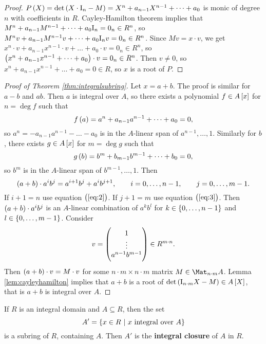 \begin{proof}
$ P\br{X} = \det \br{X \cdot \I_n - M} = X^n + a_{n - 1}X^{n - 1} + \dots + a_0 $ is monic of degree $ n $ with coefficients in $ R $. Cayley-Hamilton theorem implies that $ M^n + a_{n - 1}M^{n - 1} + \dots + a_0\mathrm{I}_n = 0_n \in R^n $, so $ M^nv + a_{n - 1}M^{n - 1}v + \dots + a_0\mathrm{I}_nv = 0_n \in R^n $. Since $ Mv = x \cdot v $, we get $ x^n \cdot v + a_{n - 1}x^{n - 1} \cdot v + \dots + a_0 \cdot v = 0_n \in R^n $, so $ \br{x^n + a_{n - 1}x^{n - 1} + \dots + a_0} \cdot v = 0_n \in R^n $. Then $ v \ne 0 $, so $ x^n + a_{n - 1}x^{n - 1} + \dots + a_0 = 0 \in R $, so $ x $ is a root of $ P $.
\end{proof}

\begin{proof}[Proof of Theorem \ref{thm:integralsubring}]
Let $ x = a + b $. The proof is similar for $ a - b $ and $ ab $. Then $ a $ is integral over $ A $, so there exists a polynomial $ f \in A\sbr{x} $ for $ n = \deg f $ such that
\begin{equation}
\label{eq:2}
f\br{a} = a^n + a_{n - 1}a^{n - 1} + \dots + a_0 = 0,
\end{equation}
so $ a^n = -a_{n - 1}a^{n - 1} - \dots - a_0 $ is in the $ A $-linear span of $ a^{n - 1}, \dots, 1 $. Similarly for $ b $, there exists $ g \in A\sbr{x} $ for $ m = \deg g $ such that
\begin{equation}
\label{eq:3}
g\br{b} = b^m + b_{m - 1}b^{m - 1} + \dots + b_0 = 0,
\end{equation}
so $ b^m $ is in the $ A $-linear span of $ b^{m - 1}, \dots, 1 $. Then
$$ \br{a + b} \cdot a^ib^j = a^{i + 1}b^j + a^ib^{j + 1}, \qquad i = 0, \dots, n - 1, \qquad j = 0, \dots, m - 1. $$
If $ i + 1 = n $ use equation $ \br{\ref{eq:2}} $. If $ j + 1 = m $ use equation $ \br{\ref{eq:3}} $. Then $ \br{a + b} \cdot a^ib^j $ is an $ A $-linear combination of $ a^kb^l $ for $ k \in \cbr{0, \dots, n - 1} $ and $ l \in \cbr{0, \dots, m - 1} $. Consider
$$ v = \begin{pmatrix} 1 \\ \vdots \\ a^{n - 1}b^{m - 1} \end{pmatrix} \in R^{m \cdot n}. $$
Then $ \br{a + b} \cdot v = M \cdot v $ for some $ n \cdot m \times n \cdot m $ matrix $ M \in \Mat_{n \cdot m} A $. Lemma \ref{lem:cayleyhamilton} implies that $ a + b $ is a root of $ \det \br{\I_{n \cdot m}X - M} \in A\sbr{X} $, that is $ a + b $ is integral over $ A $.
\end{proof}

\pagebreak

\begin{corollary}
If $ R $ is an integral domain and $ A \subseteq R $, then the set
$$ A' = \cbr{x \in R \st x \ \text{integral over} \ A} $$
is a subring of $ R $, containing $ A $. Then $ A' $ is the \textbf{integral closure} of $ A $ in $ R $.
\end{corollary}

